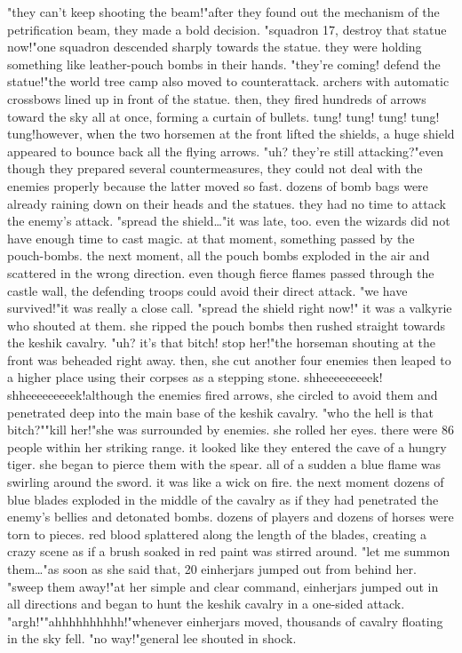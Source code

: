 "they can't keep shooting the beam!"after they found out the mechanism of the petrification beam, they made a bold decision.
"squadron 17, destroy that statue now!"one squadron descended sharply towards the statue.
 they were holding something like leather-pouch bombs in their hands.
 "they're coming! defend the statue!"the world tree camp also moved to counterattack.
 archers with automatic crossbows lined up in front of the statue.
then, they fired hundreds of arrows toward the sky all at once, forming a curtain of bullets.
tung! tung! tung! tung! tung!however, when the two horsemen at the front lifted the shields, a huge shield appeared to bounce back all the flying arrows.
"uh? they're still attacking?"even though they prepared several countermeasures, they could not deal with the enemies properly because the latter moved so fast.
dozens of bomb bags were already raining down on their heads and the statues.
 they had no time to attack the enemy's attack.
 "spread the shield…"it was late, too.
 even the wizards did not have enough time to cast magic.
 at that moment, something passed by the pouch-bombs.
 the next moment, all the pouch bombs exploded in the air and scattered in the wrong direction.
even though fierce flames passed through the castle wall, the defending troops could avoid their direct attack.
"we have survived!"it was really a close call.
 "spread the shield right now!" it was a valkyrie who shouted at them.
 she ripped the pouch bombs then rushed straight towards the keshik cavalry.
"uh? it's that bitch! stop her!"the horseman shouting at the front was beheaded right away.
 then, she cut another four enemies then leaped to a higher place using their corpses as a stepping stone.
shheeeeeeeeek! shheeeeeeeeek!although the enemies fired arrows, she circled to avoid them and penetrated deep into the main base of the keshik cavalry.
"who the hell is that bitch?""kill her!"she was surrounded by enemies.
 she rolled her eyes.
 there were 86 people within her striking range.
 it looked like they entered the cave of a hungry tiger.
 she began to pierce them with the spear.
 all of a sudden a blue flame was swirling around the sword.
 it was like a wick on fire.
the next moment dozens of blue blades exploded in the middle of the cavalry as if they had penetrated the enemy's bellies and detonated bombs.
 dozens of players and dozens of horses were torn to pieces.
 red blood splattered along the length of the blades, creating a crazy scene as if a brush soaked in red paint was stirred around.
"let me summon them…"as soon as she said that, 20 einherjars jumped out from behind her.
"sweep them away!"at her simple and clear command, einherjars jumped out in all directions and began to hunt the keshik cavalry in a one-sided attack.
"argh!""ahhhhhhhhhh!"whenever einherjars moved, thousands of cavalry floating in the sky fell.
"no way!"general lee shouted in shock.
 

